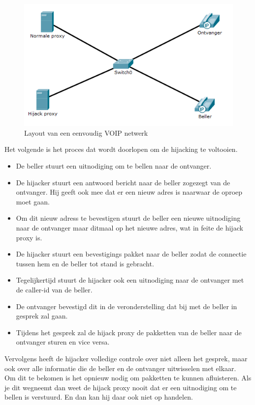 \documentclass[pdftex,a4paper,12pt,twoside]{report}
\begin{document}
\begin{figure}[H]
\caption{Layout van een eenvoudig VOIP netwerk \protect \footnotemark}
\includegraphics[scale=0.7]{img/Hijack}
\end{figure}
Het volgende is het proces dat wordt doorlopen om de hijacking te voltooien.
\begin{itemize}
	\item De beller stuurt een uitnodiging om te bellen naar de ontvanger.
	\item De hijacker stuurt een antwoord bericht naar de beller zogezegt van de ontvanger. Hij geeft ook mee dat er een nieuw adres is naarwaar de oproep moet gaan.
	\item Om dit nieuw adress te bevestigen stuurt de beller een nieuwe uitnodiging naar de ontvanger maar ditmaal op het nieuwe adres, wat in feite de hijack proxy is.
	\item De hijacker stuurt een bevestigings pakket naar de beller zodat de connectie tussen hem en de beller tot stand is gebracht. 
	\item Tegelijkertijd stuurt de hijacker ook een uitnodiging naar de ontvanger met de caller-id van de beller.
	\item De ontvanger bevestigd dit in de veronderstelling dat bij met de beller in gesprek zal gaan.
	\item Tijdens het gesprek zal de hijack proxy de pakketten van de beller naar de ontvanger sturen en vice versa. 
\end{itemize}
\newpage
Vervolgens heeft de hijacker volledige controle over niet alleen het gesprek, maar ook over alle informatie die de beller en de ontvanger uitwisselen met elkaar. \\
Om dit te bekomen is het opnieuw nodig om pakketten te kunnen afluisteren. Als je dit wegneemt dan weet de hijack proxy nooit dat er een uitnodiging om te bellen is verstuurd. En dan kan hij daar ook niet op handelen.
\end{document}
